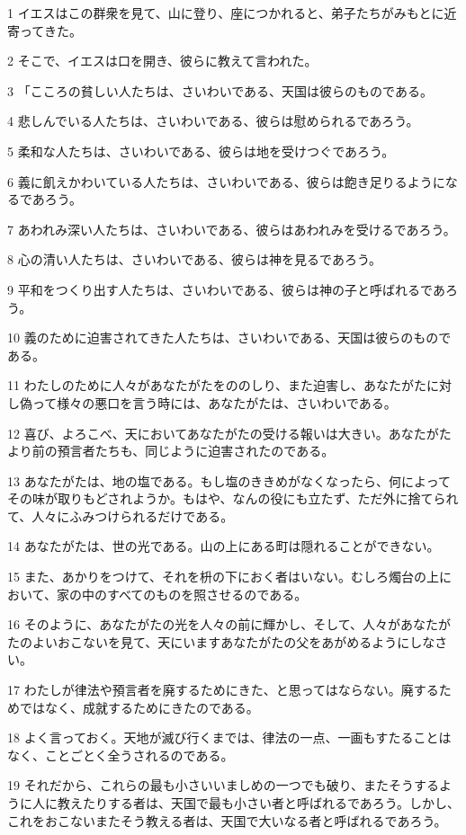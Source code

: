 \par 1 イエスはこの群衆を見て、山に登り、座につかれると、弟子たちがみもとに近寄ってきた。
\par 2 そこで、イエスは口を開き、彼らに教えて言われた。
\par 3 「こころの貧しい人たちは、さいわいである、天国は彼らのものである。
\par 4 悲しんでいる人たちは、さいわいである、彼らは慰められるであろう。
\par 5 柔和な人たちは、さいわいである、彼らは地を受けつぐであろう。
\par 6 義に飢えかわいている人たちは、さいわいである、彼らは飽き足りるようになるであろう。
\par 7 あわれみ深い人たちは、さいわいである、彼らはあわれみを受けるであろう。
\par 8 心の清い人たちは、さいわいである、彼らは神を見るであろう。
\par 9 平和をつくり出す人たちは、さいわいである、彼らは神の子と呼ばれるであろう。
\par 10 義のために迫害されてきた人たちは、さいわいである、天国は彼らのものである。
\par 11 わたしのために人々があなたがたをののしり、また迫害し、あなたがたに対し偽って様々の悪口を言う時には、あなたがたは、さいわいである。
\par 12 喜び、よろこべ、天においてあなたがたの受ける報いは大きい。あなたがたより前の預言者たちも、同じように迫害されたのである。
\par 13 あなたがたは、地の塩である。もし塩のききめがなくなったら、何によってその味が取りもどされようか。もはや、なんの役にも立たず、ただ外に捨てられて、人々にふみつけられるだけである。
\par 14 あなたがたは、世の光である。山の上にある町は隠れることができない。
\par 15 また、あかりをつけて、それを枡の下におく者はいない。むしろ燭台の上において、家の中のすべてのものを照させるのである。
\par 16 そのように、あなたがたの光を人々の前に輝かし、そして、人々があなたがたのよいおこないを見て、天にいますあなたがたの父をあがめるようにしなさい。
\par 17 わたしが律法や預言者を廃するためにきた、と思ってはならない。廃するためではなく、成就するためにきたのである。
\par 18 よく言っておく。天地が滅び行くまでは、律法の一点、一画もすたることはなく、ことごとく全うされるのである。
\par 19 それだから、これらの最も小さいいましめの一つでも破り、またそうするように人に教えたりする者は、天国で最も小さい者と呼ばれるであろう。しかし、これをおこないまたそう教える者は、天国で大いなる者と呼ばれるであろう。
